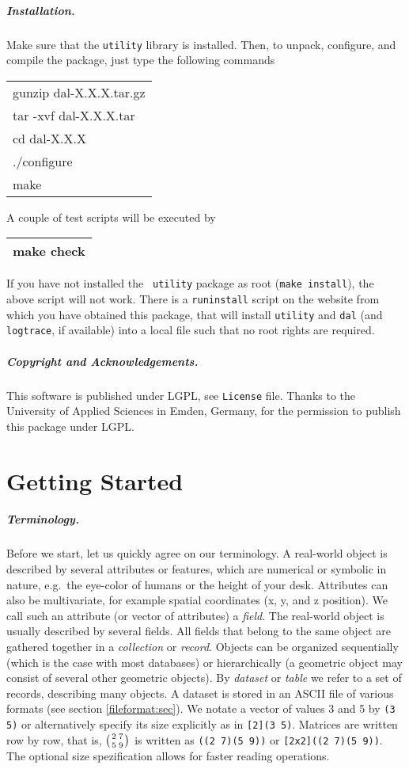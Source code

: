 \documentclass[a4paper]{book}
\newcommand{\cmd}[1]{%
{\vspace{-2mm}\tt\begin{center}\begin{tabular}{||l||}%
\hline%
#1\\%
\hline%
\end{tabular}\end{center}}\vspace{-2mm}}
\begin{document}
\paragraph{Installation.}

Make sure that the {\tt utility} library is installed. Then, to
unpack, configure, and compile the package, just type the following
commands \cmd{gunzip dal-X.X.X.tar.gz\\ tar -xvf dal-X.X.X.tar\\ cd
dal-X.X.X \\ ./configure \\ make} A couple of test scripts will be
executed by \cmd{make check} If you have not installed the {\tt
utility} package as root ({\tt make install}), the above script will
not work. There is a {\tt runinstall} script on the website from which
you have obtained this package, that will install {\tt utility} and
{\tt dal} (and {\tt logtrace}, if available) into a local file such
that no root rights are required.

\paragraph{Copyright and Acknowledgements.}
This software is published under LGPL, see {\tt License} file. Thanks
to the University of Applied Sciences in Emden, Germany, for the
permission to publish this package under LGPL.

\chapter{Getting Started} %
\label{intro:sec}

\paragraph{Terminology.}
Before we start, let us quickly agree on our terminology. A real-world
object is described by several attributes or features, which are
numerical or symbolic in nature, e.g.\ the eye-color of humans or the
height of your desk.  Attributes can also be multivariate, for example
spatial coordinates (x, y, and z position). We call such an attribute
(or vector of attributes) a {\sl field}. The real-world object is
usually described by several fields. All fields that belong to the
same object are gathered together in a {\sl collection} or {\sl
record}.  Objects can be organized sequentially (which is the case
with most databases) or hierarchically (a geometric object may consist
of several other geometric objects). By {\sl dataset} or {\sl table}
we refer to a set of records, describing many objects. A dataset is
stored in an ASCII file of various formats (see section
\ref{fileformat:sec}). We notate a vector of values 3 and 5 by {\tt (3
5)} or alternatively specify its size explicitly as in {\tt [2](3
5)}. Matrices are written row by row, that is, $\left( {2 \atop 5} {7
\atop 9}\right)$ is written as {\tt ((2 7)(5 9))} or {\tt [2x2]((2
7)(5 9))}. The optional size spezification allows for faster reading
operations.
\end{document}
